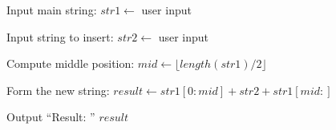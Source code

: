 \begin{algorithm}
\caption{Insert One String into the Middle of Another String}
\begin{algorithmic}[1]

\STATE Input main string:
\STATE $str1 \gets$ user input

\STATE Input string to insert:
\STATE $str2 \gets$ user input

\STATE Compute middle position:
\STATE $mid \gets \lfloor length(str1) / 2 \rfloor$

\STATE Form the new string:
\STATE $result \gets str1[0:mid] + str2 + str1[mid:]$

\STATE Output ``Result: '' $result$

\end{algorithmic}
\end{algorithm}